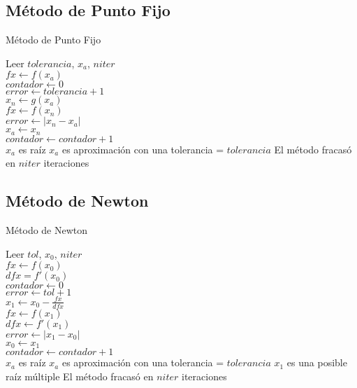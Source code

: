 \documentclass[12pt]{article}
\begin{document}
    \subsection{Método de Punto Fijo}
    \begin{algorithm}[H]
        \caption{Método de Punto Fijo}
        \SetAlgoLined
        Leer $tolerancia$, $x_a$, $niter$\\
        $fx \leftarrow f(x_a)$\\
        $contador \leftarrow 0$ \\
        $error \leftarrow tolerancia + 1$\\
        {
            $x_n \leftarrow g(x_a)$\\
            $fx \leftarrow f(x_n)$\\
            $error \leftarrow |x_n - x_a|$\\
            $x_a \leftarrow x_n$\\
            $contador \leftarrow contador + 1$\\
        }
        {$x_a$ es raíz}
        {$x_a$ es aproximación con una tolerancia = $tolerancia$}
        \Else
        {El método fracasó en $niter$ iteraciones}
    \end{algorithm}

    \subsection{Método de Newton}
    \begin{algorithm}[H]
        \caption{Método de Newton}
        \SetAlgoLined
        Leer $tol$, $x_0$, $niter$\\
        $fx \leftarrow f(x_0)$\\
        $dfx = f'(x_0)$\\
        $contador \leftarrow 0$ \\
        $error \leftarrow tol + 1$\\
        {
            $x_1 \leftarrow x_0 - \frac{fx}{dfx}$\\
            $fx \leftarrow f(x_1)$\\
            $dfx \leftarrow f'(x_1)$\\
            $error \leftarrow |x_1 - x_0|$\\
            $x_0 \leftarrow x_1$\\
            $contador \leftarrow contador + 1$\\
        }
        {$x_a$ es raíz}
        {$x_a$ es aproximación con una tolerancia = $tolerancia$}
        {$x_1$ es una posible raíz múltiple}
        \Else
        {El método fracasó en $niter$ iteraciones}	
    \end{algorithm}
\end{document}
